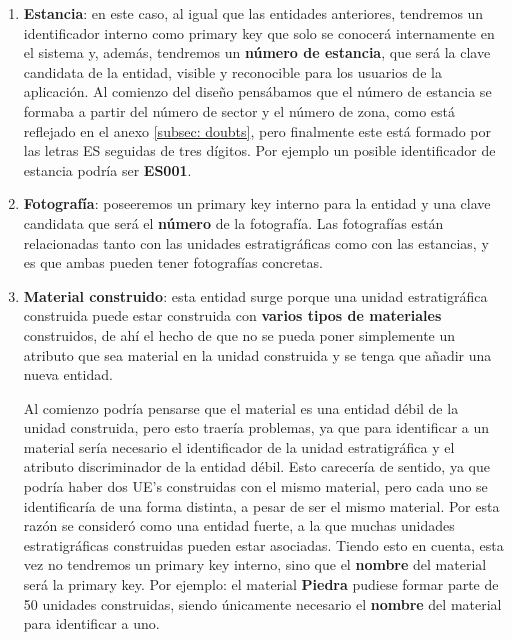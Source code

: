 \begin{enumerate}
        \item \textbf{Estancia}: en este caso, al igual que las entidades anteriores,
        tendremos un identificador interno como primary key que solo se conocerá internamente
        en el sistema y, además, tendremos un \textbf{número de estancia}, que será la clave
        candidata de la entidad, visible y reconocible para los usuarios de la aplicación. Al
        comienzo del diseño pensábamos que el número de estancia se formaba a partir del número
        de sector y el número de zona, como está reflejado en el anexo \ref{subsec: doubts},
        pero finalmente este está formado por las letras ES seguidas de tres dígitos. Por ejemplo
        un posible identificador de estancia podría ser \textbf{ES001}.

        \item \textbf{Fotografía}: poseeremos un primary key interno para la entidad y una
        clave candidata que será el \textbf{número} de la fotografía. Las fotografías están
        relacionadas tanto con las unidades estratigráficas como con las estancias, y es que 
        ambas pueden tener fotografías concretas.
        
        \item \textbf{Material construido}: esta entidad surge porque una unidad estratigráfica
        construida puede estar construida con \textbf{varios tipos de materiales} construidos,
        de ahí el hecho de que no se pueda poner simplemente un atributo que sea material en
        la unidad construida y se tenga que añadir una nueva entidad.

        Al comienzo podría pensarse que el material es una entidad débil de la unidad
        construida, pero esto traería problemas, ya que para identificar a un material sería
        necesario el identificador de la unidad estratigráfica y el atributo discriminador de
        la entidad débil. Esto carecería de sentido, ya que podría haber dos UE's construidas
        con el mismo material, pero cada uno se identificaría de una forma distinta, a pesar
        de ser el mismo material. Por esta razón se consideró como una entidad fuerte, a la
        que muchas unidades estratigráficas construidas pueden estar asociadas. Tiendo esto
        en cuenta, esta vez no tendremos un primary key interno, sino que el \textbf{nombre}
        del material será la primary key. Por ejemplo: el material \textbf{Piedra} pudiese
        formar parte de 50 unidades construidas, siendo únicamente necesario el 
        \textbf{nombre} del material para identificar a uno.
        

\end{enumerate}

